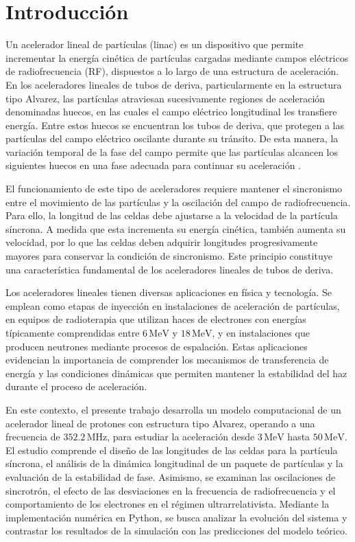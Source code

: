 \chapter{Introducción}

Un acelerador lineal de partículas (linac) es un dispositivo
que permite incrementar la energía cinética de partículas
cargadas mediante campos eléctricos de radiofrecuencia (RF),
dispuestos a lo largo de una estructura de aceleración.
En los aceleradores lineales de tubos de deriva, particularmente
en la estructura tipo Alvarez, las partículas atraviesan
sucesivamente regiones de aceleración denominadas huecos,
en las cuales el campo eléctrico longitudinal les transfiere
energía. Entre estos huecos se encuentran los tubos de deriva,
que protegen a las partículas del campo eléctrico oscilante
durante su tránsito. De esta manera, la variación temporal
de la fase del campo permite que las partículas alcancen
los siguientes huecos en una fase adecuada para continuar
su aceleración \parencite{wangler,wille}.

El funcionamiento de este tipo de aceleradores requiere
mantener el sincronismo entre el movimiento de las partículas
y la oscilación del campo de radiofrecuencia. Para ello,
la longitud de las celdas debe ajustarse a la velocidad
de la partícula síncrona. A medida que esta incrementa
su energía cinética, también aumenta su velocidad, por
lo que las celdas deben adquirir longitudes progresivamente
mayores para conservar la condición de sincronismo.
Este principio constituye una característica fundamental
de los aceleradores lineales de tubos de deriva.

Los aceleradores lineales tienen diversas aplicaciones
en física y tecnología. Se emplean como etapas de inyección
en instalaciones de aceleración de partículas, en equipos
de radioterapia que utilizan haces de electrones con energías
típicamente comprendidas entre
$6\,\mathrm{MeV}$ y $18\,\mathrm{MeV}$,
y en instalaciones que producen neutrones mediante procesos
de espalación. Estas aplicaciones evidencian la importancia
de comprender los mecanismos de transferencia de energía
y las condiciones dinámicas que permiten mantener
la estabilidad del haz durante el proceso de aceleración.

En este contexto, el presente trabajo desarrolla un modelo
computacional de un acelerador lineal de protones con
estructura tipo Alvarez, operando a una frecuencia de
$352.2\,\mathrm{MHz}$, para estudiar la aceleración desde
$3\,\mathrm{MeV}$ hasta $50\,\mathrm{MeV}$.
El estudio comprende el diseño de las longitudes de las
celdas para la partícula síncrona, el análisis de la dinámica
longitudinal de un paquete de partículas y la evaluación
de la estabilidad de fase. Asimismo, se examinan las
oscilaciones de sincrotrón, el efecto de las desviaciones
en la frecuencia de radiofrecuencia y el comportamiento
de los electrones en el régimen ultrarrelativista.
Mediante la implementación numérica en Python, se busca
analizar la evolución del sistema y contrastar los resultados
de la simulación con las predicciones del modelo teórico.
